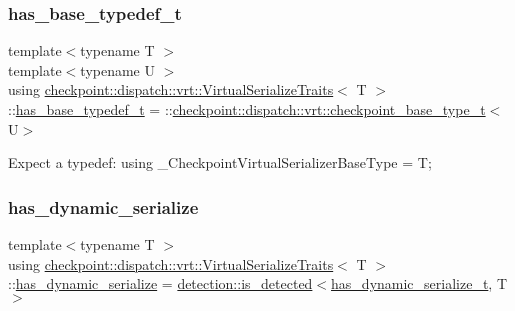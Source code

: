 \subsubsection{\texorpdfstring{has\+\_\+base\+\_\+typedef\+\_\+t}{has\_base\_typedef\_t}}
{\footnotesize\ttfamily template$<$typename T $>$ \\
template$<$typename U $>$ \\
using \hyperlink{structcheckpoint_1_1dispatch_1_1vrt_1_1_virtual_serialize_traits}{checkpoint\+::dispatch\+::vrt\+::\+Virtual\+Serialize\+Traits}$<$ T $>$\+::\hyperlink{structcheckpoint_1_1dispatch_1_1vrt_1_1_virtual_serialize_traits_a900e9fcb655c36ab48fd6db0f0258b75}{has\+\_\+base\+\_\+typedef\+\_\+t} =  \+::\hyperlink{namespacecheckpoint_1_1dispatch_1_1vrt_a41abdf16741a7c58e926d9813985bd2f}{checkpoint\+::dispatch\+::vrt\+::checkpoint\+\_\+base\+\_\+type\+\_\+t}$<$U$>$}

Expect a typedef\+: using \+\_\+\+Checkpoint\+Virtual\+Serializer\+Base\+Type = T; \mbox{\label{structcheckpoint_1_1dispatch_1_1vrt_1_1_virtual_serialize_traits_a716daac95820b854a4f7dc6ae1eb8d2f}} 
\subsubsection{\texorpdfstring{has\+\_\+dynamic\+\_\+serialize}{has\_dynamic\_serialize}}
{\footnotesize\ttfamily template$<$typename T $>$ \\
using \hyperlink{structcheckpoint_1_1dispatch_1_1vrt_1_1_virtual_serialize_traits}{checkpoint\+::dispatch\+::vrt\+::\+Virtual\+Serialize\+Traits}$<$ T $>$\+::\hyperlink{structcheckpoint_1_1dispatch_1_1vrt_1_1_virtual_serialize_traits_a716daac95820b854a4f7dc6ae1eb8d2f}{has\+\_\+dynamic\+\_\+serialize} =  \hyperlink{namespacedetection_a30893549a3de1e9603d78dad6d5dce92}{detection\+::is\+\_\+detected}$<$\hyperlink{structcheckpoint_1_1dispatch_1_1vrt_1_1_virtual_serialize_traits_a5b78afee2cf468bf3fedddb017c9aad0}{has\+\_\+dynamic\+\_\+serialize\+\_\+t}, T$>$}

\mbox{\label{structcheckpoint_1_1dispatch_1_1vrt_1_1_virtual_serialize_traits_a5b78afee2cf468bf3fedddb017c9aad0}} 
